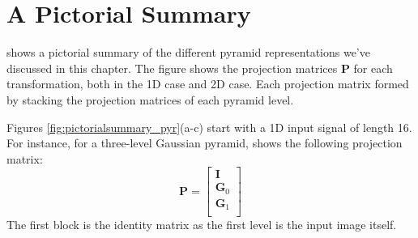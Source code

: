 %
%
%
%
%
%
%
%
%
%
%

\section{A Pictorial Summary}

\Fig{\ref{fig:pictorialsummary_pyr}} shows a pictorial summary of the different pyramid representations we've discussed in this chapter.  The figure shows the projection matrices $\mathbf{P}$ for each transformation, both in the 1D case and 2D case. Each projection matrix formed by stacking the projection matrices of each pyramid level.


Figures \ref{fig:pictorialsummary_pyr}(a-c) start with a 1D input signal of length 16. For instance, for a three-level Gaussian pyramid,  shows the following projection matrix: 
\begin{equation}
    \mathbf{P} =  
    \begin{bmatrix}
    \mathbf{I} \\
    \mathbf{G}_0 \\
    \mathbf{G}_1 \\
    \end{bmatrix}
\end{equation}
The first block is the identity matrix as the first level is the input image itself. 

